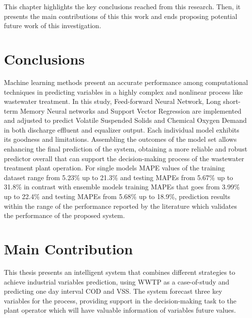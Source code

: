 This chapter highlights the key conclusions reached from this research. Then, it presents the main contributions of this this work and ends proposing potential future work of this investigation. 

\section{Conclusions}

Machine learning methods present an accurate performance among computational techniques in predicting variables in a highly complex and nonlinear process like wastewater treatment. In this study, Feed-forward Neural Network, Long short-term Memory Neural networks and Support Vector Regression are implemented and adjusted to predict Volatile Suspended Solids and Chemical Oxygen Demand in both discharge effluent and equalizer output. Each individual model exhibits its goodness and limitations. Assembling the outcomes of the model set allows enhancing the final prediction of the system, obtaining a more reliable and robust predictor overall that can support the decision-making process of the wastewater treatment plant operation. For single models \ac{MAPE} values of the training dataset range from 5.23\% up to 21.3\% and testing \ac{MAPE}s from 5.67\% up to 31.8\% in contrast with ensemble models training \ac{MAPE}s that goes from 3.99\% up to 22.4\% and testing \ac{MAPE}s from 5.68\% up to 18.9\%, prediction results within the range of the performance reported by the literature which validates the performance of the proposed system. 


\section{Main Contribution}

This thesis presents an intelligent system that combines different strategies to achieve industrial variables prediction, using WWTP as a case-of-study and predicting one day interval COD and VSS. The system forecast three key variables for the process, providing support in the decision-making task to the plant operator which will have valuable information of variables future values.

